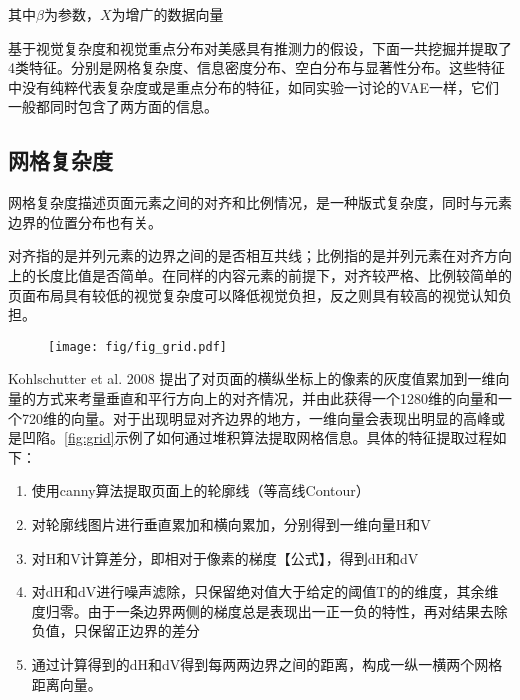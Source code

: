 其中$\beta$为参数，$X$为增广的数据向量

基于视觉复杂度和视觉重点分布对美感具有推测力的假设，下面一共挖掘并提取了4类特征。分别是网格复杂度、信息密度分布、空白分布与显著性分布。这些特征中没有纯粹代表复杂度或是重点分布的特征，如同实验一讨论的VAE一样，它们一般都同时包含了两方面的信息。

\subsection{网格复杂度}
网格复杂度描述页面元素之间的对齐和比例情况，是一种版式复杂度，同时与元素边界的位置分布也有关。

对齐指的是并列元素的边界之间的是否相互共线；比例指的是并列元素在对齐方向上的长度比值是否简单。在同样的内容元素的前提下，对齐较严格、比例较简单的页面布局具有较低的视觉复杂度可以降低视觉负担，反之则具有较高的视觉认知负担。

\begin{figure}[H]
  \texttt{[image: fig/fig\_grid.pdf]}
\end{figure}

Kohlschutter et al. 2008 提出了对页面的横纵坐标上的像素的灰度值累加到一维向量的方式来考量垂直和平行方向上的对齐情况，并由此获得一个1280维的向量和一个720维的向量。对于出现明显对齐边界的地方，一维向量会表现出明显的高峰或是凹陷。\ref{fig:grid}示例了如何通过堆积算法提取网格信息。具体的特征提取过程如下：

\begin{enumerate}
  \item 使用canny算法提取页面上的轮廓线（等高线Contour）
  \item 对轮廓线图片进行垂直累加和横向累加，分别得到一维向量H和V
  \item 对H和V计算差分，即相对于像素的梯度【公式】，得到dH和dV
  \item 对dH和dV进行噪声滤除，只保留绝对值大于给定的阈值T的的维度，其余维度归零。由于一条边界两侧的梯度总是表现出一正一负的特性，再对结果去除负值，只保留正边界的差分
  \item 通过计算得到的dH和dV得到每两两边界之间的距离，构成一纵一横两个网格距离向量。
\end{enumerate}

